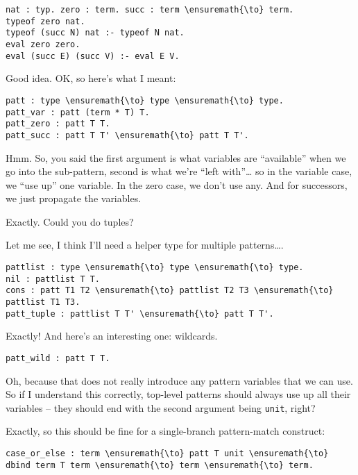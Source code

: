 \begin{verbatim}
nat : typ. zero : term. succ : term \ensuremath{\to} term.
typeof zero nat.
typeof (succ N) nat :- typeof N nat.
eval zero zero.
eval (succ E) (succ V) :- eval E V.
\end{verbatim}

\heroADVISOR{} Good idea. OK, so here's what I meant:

\begin{verbatim}
patt : type \ensuremath{\to} type \ensuremath{\to} type.
patt_var : patt (term * T) T.
patt_zero : patt T T.
patt_succ : patt T T' \ensuremath{\to} patt T T'.
\end{verbatim}

\heroSTUDENT{} Hmm. So, you said the first argument is what variables are
``available'' when we go into the sub-pattern, second is what we're
``left with''\ldots{} so in the variable case, we ``use up'' one
variable. In the zero case, we don't use any. And for successors, we
just propagate the variables.

\heroADVISOR{} Exactly. Could you do tuples?

\heroSTUDENT{} Let me see, I think I'll need a helper type for multiple
patterns\ldots{}.

\begin{verbatim}
pattlist : type \ensuremath{\to} type \ensuremath{\to} type.
nil : pattlist T T.
cons : patt T1 T2 \ensuremath{\to} pattlist T2 T3 \ensuremath{\to} pattlist T1 T3.
patt_tuple : pattlist T T' \ensuremath{\to} patt T T'.
\end{verbatim}

\heroADVISOR{} Exactly! And here's an interesting one: wildcards.

\begin{verbatim}
patt_wild : patt T T.
\end{verbatim}

\heroSTUDENT{} Oh, because that does not really introduce any pattern
variables that we can use. So if I understand this correctly, top-level
patterns should always use up all their variables -- they should end
with the second argument being \texttt{unit}, right?

\heroADVISOR{} Exactly, so this should be fine for a single-branch
pattern-match construct:

\begin{verbatim}
case_or_else : term \ensuremath{\to} patt T unit \ensuremath{\to} dbind term T term \ensuremath{\to} term \ensuremath{\to} term.
\end{verbatim}

